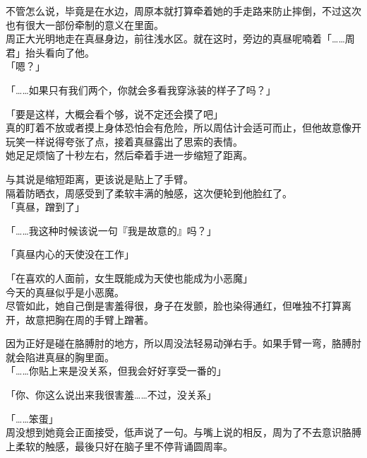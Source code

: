 不管怎么说，毕竟是在水边，周原本就打算牵着她的手走路来防止摔倒，不过这次也有很大一部份牵制的意义在里面。\\

周正大光明地走在真昼身边，前往浅水区。就在这时，旁边的真昼呢喃着「……周君」抬头看向了他。\\

「嗯？」

「……如果只有我们两个，你就会多看我穿泳装的样子了吗？」

「要是这样，大概会看个够，说不定还会摸了吧」\\

真的盯着不放或者摸上身体恐怕会有危险，所以周估计会适可而止，但他故意像开玩笑一样说得夸张了点，接着真昼露出了思索的表情。\\

她足足烦恼了十秒左右，然后牵着手进一步缩短了距离。

与其说是缩短距离，更该说是贴上了手臂。\\

隔着防晒衣，周感受到了柔软丰满的触感，这次便轮到他脸红了。\\

「真昼，蹭到了」

「……我这种时候该说一句『我是故意的』吗？」

「真昼内心的天使没在工作」

「在喜欢的人面前，女生既能成为天使也能成为小恶魔」\\

今天的真昼似乎是小恶魔。\\

尽管如此，她自己倒是害羞得很，身子在发颤，脸也染得通红，但唯独不打算离开，故意把胸在周的手臂上蹭著。

因为正好是碰在胳膊肘的地方，所以周没法轻易动弹右手。如果手臂一弯，胳膊肘就会陷进真昼的胸里面。\\

「……你贴上来是没关系，但我会好好享受一番的」

「你、你这么说出来我很害羞……不过，没关系」

「……笨蛋」\\

周没想到她竟会正面接受，低声说了一句。与嘴上说的相反，周为了不去意识胳膊上柔软的触感，最後只好在脑子里不停背诵圆周率。
